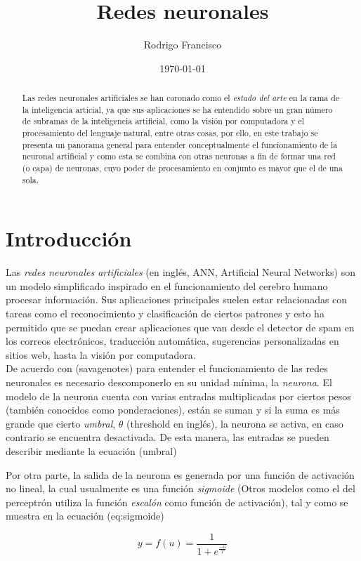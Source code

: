 \documentclass{article}
\author{Rodrigo Francisco}
\title{Redes neuronales}
\date{\today}
\begin{document}
  \begin{abstract}
    Las redes neuronales artificiales se han coronado como el \textit{estado del
    arte} en la rama de la inteligencia articial, ya que sus aplicaciones se ha
    entendido sobre un gran número de subramas de la inteligencia artificial,
    como la visión por computadora y el procesamiento del lenguaje natural,
    entre otras cosas, por ello, en este trabajo se presenta un panorama general
    para entender conceptualmente el funcionamiento de la neuronal artificial y
    como esta se combina con otras neuronas a fin de formar una red (o capa) de
    neuronas, cuyo poder de procesamiento en conjunto es mayor que el de una
    sola.
  \end{abstract}

  \section{Introducción}

  Las \textit{redes neuronales artificiales} (en inglés, ANN, Artificial Neural
  Networks) son un modelo simplificado inspirado en el funcionamiento del
  cerebro humano procesar información. Sus aplicaciones principales suelen estar
  relacionadas con tareas como el reconocimiento y clasificación de ciertos
  patrones y esto ha permitido que se puedan crear aplicaciones que van desde el
  detector de spam en los correos electrónicos, traducción automática,
  sugerencias personalizadas en sitios web, hasta la visión por
  computadora.\\

  De acuerdo con (savagenotes) para entender el funcionamiento de las redes
  neuronales es necesario descomponerlo en su unidad mínima, la
  \textit{neurona}.  El modelo
  de la neurona cuenta con varias entradas multiplicadas por ciertos pesos
  (también conocidos como ponderaciones), están se suman y si la suma es más
  grande que cierto \textit{umbral}, \(\theta\) (threshold en inglés), la neurona
  se activa, en caso contrario se encuentra desactivada. De esta manera, las
  entradas se pueden describir mediante la ecuación (umbral)


  Por otra parte, la salida de la neurona es generada por una función de
  activación no lineal, la cual usualmente es una función \textit{sigmoide}
  (Otros modelos como el del perceptrón utiliza la función
  \textit{escalón} como función de activación), tal y como se muestra en la
  ecuación (eq:sigmoide)

  \[
    y = f(u) = \dfrac{1}{1+e^{\frac{-u}{T}}}
  \]
\end{document}
